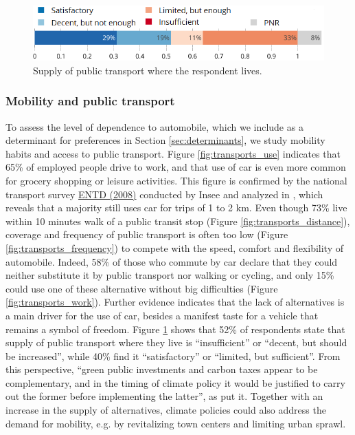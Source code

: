 \documentclass[english,5p,authoryear]{elsarticle}
\begin{document}
\begin{figure}[t]
\centering
\includegraphics[width=\columnwidth]{Images/transports_opinion_trim.png}
\caption{Supply of public transport where the respondent lives.}
\label{fig:transports_opinion}
\end{figure}

    \subsubsection{Mobility and public transport}

To assess the level of dependence to automobile, which we include as a determinant for preferences in Section \ref{sec:determinants}, we study mobility habits and access to public transport. Figure \ref{fig:transports_use} indicates that 65\% of employed people drive to work, and that use of car is even more common for grocery shopping or leisure activities. This figure is confirmed by the national transport survey \hyperlink{http://www.progedo-adisp.fr/enquetes/XML/lil-0634.xml}{ENTD (2008)} conducted by Insee and analyzed in \cite{pappalardo_mobilite_2010}, which reveals that a majority still uses car for trips of 1 to 2 km. Even though 73\% live within 10 minutes walk of a public transit stop (Figure \ref{fig:transports_distance}), coverage and frequency of public transport is often too low (Figure \ref{fig:transports_frequency}) to compete with the speed, comfort and flexibility of automobile. Indeed, 58\% of those who commute by car declare that they could neither substitute it by public transport nor walking or cycling, and only 15\% could use one of these alternative without big difficulties (Figure \ref{fig:transports_work}). Further evidence indicates that the lack of alternatives is a main driver for the use of car, besides a manifest taste for a vehicle that remains a symbol of freedom. Figure \ref{fig:transports_opinion} shows that 52\% of respondents state that supply of public transport where they live is ``insufficient'' or ``decent, but should be increased'', while 40\% find it ``satisfactory'' or ``limited, but sufficient''. From this perspective, ``green public investments and carbon taxes appear to be complementary, and in the timing of climate policy it would be justified to carry out the former before implementing the latter'', as \cite{bureau_pour_2019} put it. Together with an increase in the supply of alternatives, climate policies could also address the demand for mobility, e.g. by revitalizing town centers and limiting urban sprawl.
\end{document}
